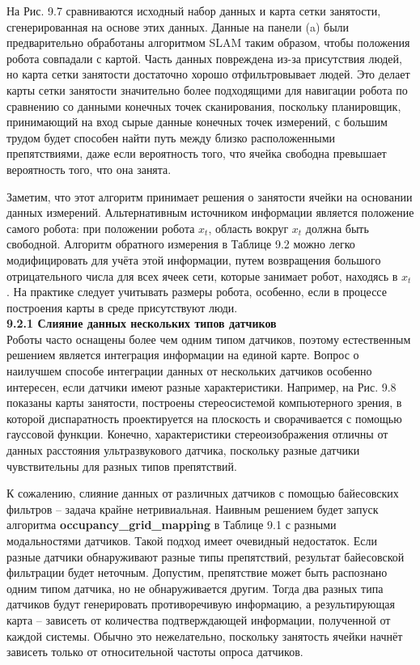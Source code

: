 \documentclass[10pt,a4paper]{article}
\begin{document}
На Рис. 9.7 сравниваются исходный набор данных и карта сетки занятости, сгенерированная на основе этих данных. Данные на панели (a) были предварительно обработаны алгоритмом SLAM таким образом, чтобы положения робота совпадали с картой. Часть данных повреждена из-за присутствия людей, но карта сетки занятости достаточно хорошо отфильтровывает людей. Это делает карты сетки занятости значительно более подходящими для навигации робота по сравнению со данными конечных точек сканирования, поскольку планировщик, принимающий на вход сырые данные конечных точек измерений, с большим трудом будет способен найти путь между близко расположенными препятствиями, даже если вероятность того, что ячейка свободна превышает вероятность того, что она занята. 

Заметим, что этот алгоритм принимает решения о занятости ячейки на основании данных измерений. Альтернативным источником информации является положение самого робота: при положении робота $x_t$, область вокруг $x_t$ должна быть свободной. Алгоритм обратного измерения в Таблице 9.2 можно легко модифицировать для учёта этой информации, путем возвращения большого отрицательного числа для всех ячеек сети, которые занимает робот, находясь в $x_t$. На практике следует учитывать размеры робота, особенно, если в процессе построения карты в среде присутствуют люди.\\ 

\textbf{9.2.1	Слияние данных нескольких типов датчиков}\\

Роботы часто оснащены более чем одним типом датчиков, поэтому естественным решением является интеграция информации на единой карте. Вопрос о наилучшем способе интеграции данных от нескольких датчиков особенно интересен, если датчики имеют разные характеристики. Например, на Рис. 9.8 показаны карты занятости, построены стереосистемой компьютерного зрения, в которой диспаратность проектируется на плоскость и сворачивается с помощью гауссовой функции. Конечно, характеристики стереоизображения отличны от данных расстояния ультразвукового датчика, поскольку разные датчики чувствительны для разных типов препятствий.

К сожалению, слияние данных от различных датчиков с помощью байесовских фильтров – задача крайне нетривиальная. Наивным решением будет запуск алгоритма \textbf{occupancy\_grid\_mapping} в Таблице 9.1 с разными модальностями датчиков. Такой подход имеет очевидный недостаток. Если разные датчики обнаруживают разные типы препятствий, результат байесовской фильтрации будет неточным. Допустим, препятствие может быть распознано одним типом датчика, но не обнаруживается другим. Тогда два разных типа датчиков будут генерировать противоречивую информацию, а результирующая карта – зависеть от количества подтверждающей информации, полученной от каждой системы. Обычно это нежелательно, поскольку занятость ячейки начнёт зависеть только от относительной частоты опроса датчиков.
\end{document}
